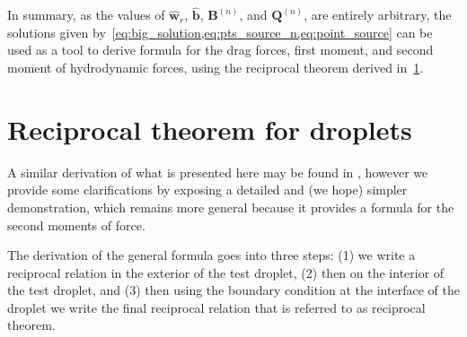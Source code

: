 In summary, as the values of $\hat{\textbf{w}}_r$, $\hat{\textbf{b}}$, $\textbf{B}^{(n)}$, and $\textbf{Q}^{(n)}$, are entirely arbitrary, the solutions given by~\ref{eq:big_solution,eq:pts_source_n,eq:point_source} can be used as a tool to derive formula for the drag forces, first moment, and second moment of hydrodynamic forces, using the reciprocal theorem derived in~\ref{sec:reciprocal}.  

\section{Reciprocal theorem for droplets}
\label{sec:reciprocal}

A similar derivation of what is presented here may be found in \citet{lovalenti1993force,raja2010inertial}, however we provide some clarifications by exposing a detailed and  (we hope) simpler demonstration, which remains more general because it provides a formula for the second moments of force.  

The derivation of the general formula goes into three steps: (1) we write a reciprocal relation in the exterior of the test droplet, (2) then on the interior of the test  droplet, and (3) then using the boundary condition at the interface of the droplet we write the final reciprocal relation that is referred to as reciprocal theorem. 

